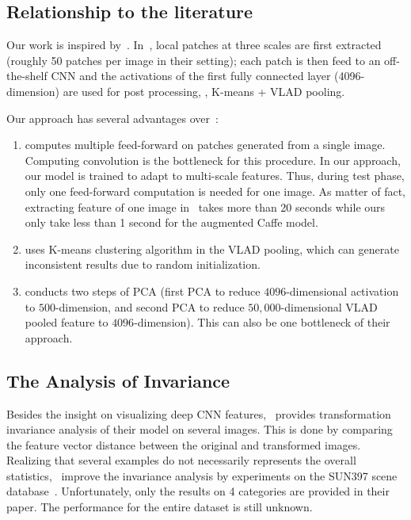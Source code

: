 \documentclass[10pt,twocolumn,letterpaper]{article}
\begin{document}
\subsection{Relationship to the literature}

Our work is inspired by~\cite{Gong14}. In~\cite{Gong14}, local patches at three scales are first extracted (roughly 50 patches per image in their setting); each patch is then feed to an off-the-shelf CNN and the activations of the first fully connected layer (4096-dimension) are used for post processing, \ie, K-means + VLAD pooling. 

Our approach has several advantages over~\cite{Gong14}:
\begin{enumerate}
\item \cite{Gong14} computes multiple feed-forward on patches generated from a single image. Computing convolution is the bottleneck for this procedure. In our approach, our model is trained to adapt to multi-scale features. Thus, during test phase,
only one feed-forward computation is needed for one image. As matter of fact, extracting feature of one image in~\cite{Gong14} takes more than 20 seconds while ours only take less than 1 second for the augmented Caffe model. 

\item \cite{Gong14} uses K-means clustering algorithm in the VLAD pooling, which can generate inconsistent results due to random initialization. 

\item \cite{Gong14} conducts two steps of PCA (first PCA to reduce $4096$-dimensional activation to $500$-dimension, and second PCA to reduce $50,000$-dimensional VLAD pooled feature to $4096$-dimension). This can also be one bottleneck of their approach. 

\end{enumerate} 


\subsection{The Analysis of Invariance}

Besides the insight on visualizing deep CNN features,~\cite{visual_cnn} provides transformation invariance analysis of their model on several images. This is done by comparing the feature vector distance between the original and transformed images. Realizing that several examples do not necessarily represents the overall statistics,~\cite{Gong14} improve the invariance analysis by experiments on the SUN397 scene database~\cite{SUN397}. Unfortunately, only the results on 4 categories are provided in their paper. The performance for the entire dataset is still unknown.
\end{document}
